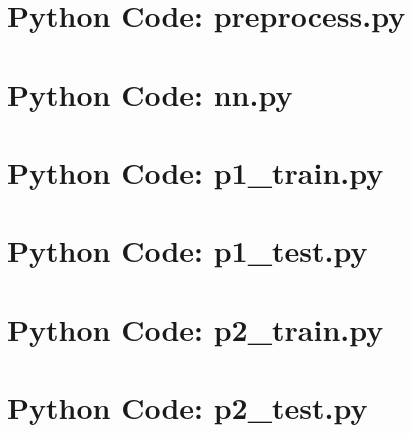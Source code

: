 \documentclass[11pt,titlepage]{article}
\begin{document}
\newpage
\begin{appendices}
\section{Python Code: preprocess.py}


\newpage
\section{Python Code: nn.py}


\newpage
\section{Python Code: p1\_train.py}


\newpage
\section{Python Code: p1\_test.py}


\newpage
\section{Python Code: p2\_train.py}


\newpage
\section{Python Code: p2\_test.py}


\end{appendices}
\end{document}
